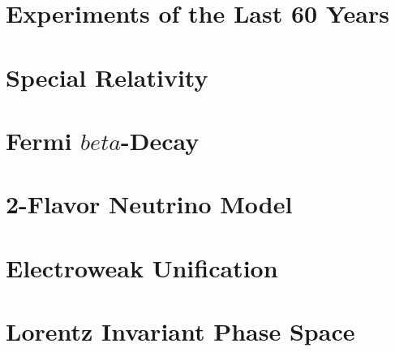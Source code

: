 \documentclass{report}
\begin{document}
\appendix
\chapter{Experiments of the Last 60 Years}


\chapter{Special Relativity}


\chapter{Fermi $beta$-Decay}


\chapter{2-Flavor Neutrino Model}


\chapter{Electroweak Unification}


\chapter{Lorentz Invariant Phase Space}

\end{document}
